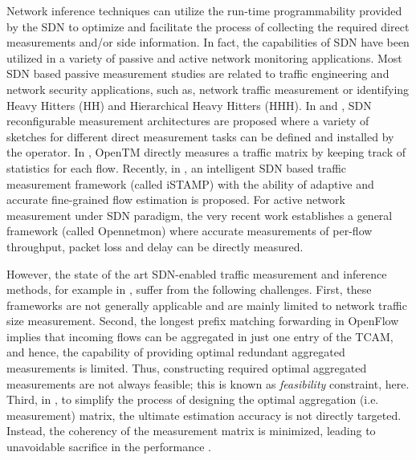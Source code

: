 Network inference techniques can
utilize the run-time programmability provided by the SDN to optimize
and facilitate the process of collecting the required direct
measurements and/or side information. In fact, the capabilities of SDN
have been utilized in a variety of passive and active network
monitoring applications. Most SDN based passive measurement studies
are related to traffic engineering and network security applications,
such as, network traffic measurement or identifying Heavy Hitters (HH)
and Hierarchical Heavy Hitters (HHH). In \cite{MYu:2011} and
\cite{MYu:2013}, SDN reconfigurable measurement architectures are
proposed where a variety of sketches for different direct measurement
tasks can be defined and installed by the operator. In
\cite{Tootoonchian:2010}, OpenTM directly measures a traffic matrix by
keeping track of statistics for each flow. Recently, in
\cite{IF14iSTAMP:2014}, an intelligent SDN based traffic measurement
framework (called iSTAMP) with the ability of adaptive and accurate
fine-grained flow estimation is proposed. For active network
measurement under SDN paradigm, the very recent work
\cite{Adrichen:2014} establishes a general framework (called
Opennetmon) where accurate measurements of per-flow throughput, packet
loss and delay can be directly measured.

However, the state of the art SDN-enabled traffic measurement and
inference methods, for example in \cite{MYu:2013}
\cite{IF14iSTAMP:2014}, suffer from the following challenges. First,
these frameworks are not generally applicable and are mainly limited
to network traffic size measurement. Second, the longest prefix matching
forwarding in OpenFlow implies that incoming flows can be aggregated
in just one entry of the TCAM, and hence, the capability of providing
optimal redundant aggregated measurements is limited. Thus, constructing required optimal aggregated measurements are not always feasible; this is known as \emph{feasibility} constraint, here. Third, in
\cite{IF14iSTAMP:2014}, to simplify the process of designing the
optimal aggregation (i.e. measurement) matrix, the ultimate estimation
accuracy is not directly targeted. Instead, the coherency of the
measurement matrix is minimized, leading to unavoidable sacrifice in
the performance \cite{IF14iSTAMP:2014}\cite{Elad:2007}.

